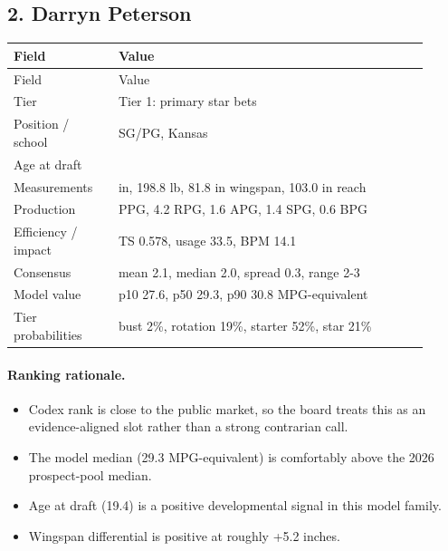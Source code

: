 \documentclass[11pt]{article}
\begin{document}
\subsection{2. Darryn Peterson}
\begin{center}
\scriptsize
\begin{longtable}{@{}>{\raggedright\arraybackslash}p{0.230\linewidth}>{\raggedright\arraybackslash}p{0.680\linewidth}@{}}
\toprule
Field & Value \\
\midrule
\endfirsthead
\toprule
Field & Value \\
\midrule
\endhead
Tier & Tier 1: primary star bets \\
Position / school & SG/PG, Kansas \\
Age at draft & 19.4 \\
Measurements & 76.5 in, 198.8 lb, 81.8 in wingspan, 103.0 in reach \\
Production & 20.2 PPG, 4.2 RPG, 1.6 APG, 1.4 SPG, 0.6 BPG \\
Efficiency / impact & TS 0.578, usage 33.5, BPM 14.1 \\
Consensus & mean 2.1, median 2.0, spread 0.3, range 2-3 \\
Model value & p10 27.6, p50 29.3, p90 30.8 MPG-equivalent \\
Tier probabilities & bust 2\%, rotation 19\%, starter 52\%, star 21\% \\
\bottomrule
\end{longtable}
\end{center}

\paragraph{Ranking rationale.}
\begin{itemize}[leftmargin=*]
\item Codex rank is close to the public market, so the board treats this as an evidence-aligned slot rather than a strong contrarian call.
\item The model median (29.3 MPG-equivalent) is comfortably above the 2026 prospect-pool median.
\item Age at draft (19.4) is a positive developmental signal in this model family.
\item Wingspan differential is positive at roughly +5.2 inches.
\end{itemize}
\end{document}
